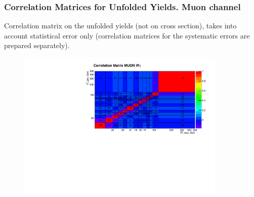 \begin{frame}\frametitle{Correlation Matrices for Unfolded Yields. Muon channel}
\scriptsize Correlation matrix on the unfolded yields (not on cross section), takes into account statistical error only (correlation matrices for the systematic errors are prepared separately).
\begin{figure}[htb]
  \begin{center}
   \includegraphics[width=0.89\textwidth]{../figs/figs_v11/MUON_WGamma/Constants/matrCorrelation_yield_pm_stat.pdf}\\
  \label{fig:covMatrices_Wg}
  \end{center}
\end{figure}
\end{frame}%

